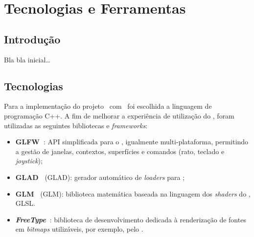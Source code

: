 \chapter{Tecnologias e Ferramentas}
\label{ch::tecno}

\section{Introdução}
\label{sec::tecno:intro}

Bla bla inicial\ldots


\section{Tecnologias}
\label{sec::tecno:tecno}

Para a implementação do projeto \theapp~com \opengl~foi escolhida a linguagem de programação C++. A fim de melhorar a experiência de utilização do \opengl, foram utilizadas as seguintes bibliotecas e \textit{frameworks}:

\begin{itemize}
    
    \item \textbf{GLFW~\cite{glfw}}: \ac{API} simplificada para o \opengl, igualmente multi-plataforma, permitindo a gestão de janelas, contextos, superfícies e comandos (rato, teclado e \textit{joystick});
    
    \item \textbf{\acs{GLAD}~\cite{glad,glad-webservice}} (\acl{GLAD}): gerador automático de \textit{loaders} para \opengl;
    
    \item \textbf{\acs{GLM}~\cite{glm}} (\acl{GLM}): biblioteca matemática baseada na linguagem dos \textit{shaders} do \opengl, \ac{GLSL}.
    
    \item \textbf{\textit{FreeType}~\cite{freetype}}: biblioteca de desenvolvimento dedicada à renderização de fontes em \textit{bitmaps} utilizáveis, por exemplo, pelo \opengl.
    
    
\end{itemize}

